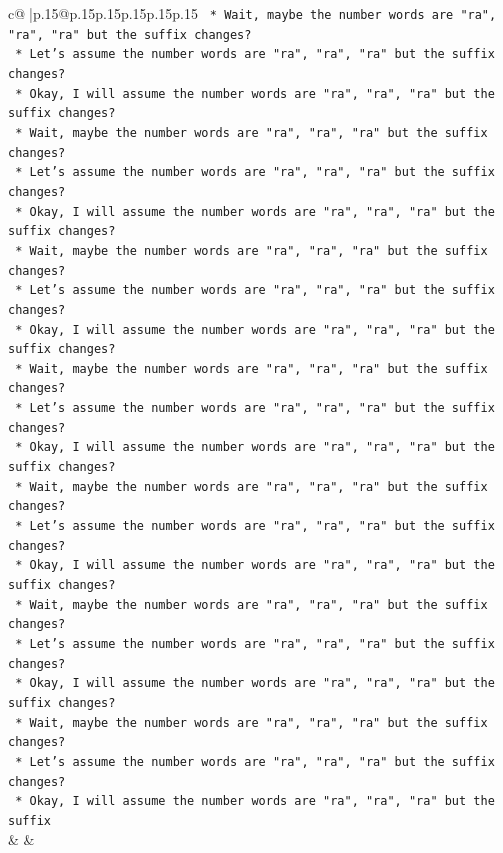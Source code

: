 \documentclass{article}
\begin{document}
{\begin{supertabular}{c@{$\;$}|p{.15\linewidth}@{}p{.15\linewidth}p{.15\linewidth}p{.15\linewidth}p{.15\linewidth}p{.15\linewidth}}
{{{\texttt{    *   Wait, maybe the number words are "ra", "ra", "ra" but the suffix changes?} \\
\texttt{    *   Let's assume the number words are "ra", "ra", "ra" but the suffix changes?} \\
\texttt{    *   Okay, I will assume the number words are "ra", "ra", "ra" but the suffix changes?} \\
\texttt{    *   Wait, maybe the number words are "ra", "ra", "ra" but the suffix changes?} \\
\texttt{    *   Let's assume the number words are "ra", "ra", "ra" but the suffix changes?} \\
\texttt{    *   Okay, I will assume the number words are "ra", "ra", "ra" but the suffix changes?} \\
\texttt{    *   Wait, maybe the number words are "ra", "ra", "ra" but the suffix changes?} \\
\texttt{    *   Let's assume the number words are "ra", "ra", "ra" but the suffix changes?} \\
\texttt{    *   Okay, I will assume the number words are "ra", "ra", "ra" but the suffix changes?} \\
\texttt{    *   Wait, maybe the number words are "ra", "ra", "ra" but the suffix changes?} \\
\texttt{    *   Let's assume the number words are "ra", "ra", "ra" but the suffix changes?} \\
\texttt{    *   Okay, I will assume the number words are "ra", "ra", "ra" but the suffix changes?} \\
\texttt{    *   Wait, maybe the number words are "ra", "ra", "ra" but the suffix changes?} \\
\texttt{    *   Let's assume the number words are "ra", "ra", "ra" but the suffix changes?} \\
\texttt{    *   Okay, I will assume the number words are "ra", "ra", "ra" but the suffix changes?} \\
\texttt{    *   Wait, maybe the number words are "ra", "ra", "ra" but the suffix changes?} \\
\texttt{    *   Let's assume the number words are "ra", "ra", "ra" but the suffix changes?} \\
\texttt{    *   Okay, I will assume the number words are "ra", "ra", "ra" but the suffix changes?} \\
\texttt{    *   Wait, maybe the number words are "ra", "ra", "ra" but the suffix changes?} \\
\texttt{    *   Let's assume the number words are "ra", "ra", "ra" but the suffix changes?} \\
\texttt{    *   Okay, I will assume the number words are "ra", "ra", "ra" but the suffix} \\
            }
        }
    }
    & & \\ \\


\end{supertabular}}
\end{document}

